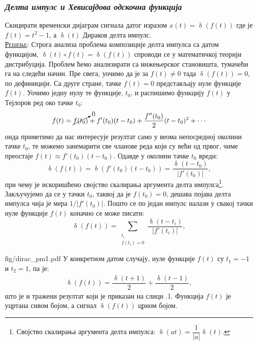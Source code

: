 \subsubsection{\textit{Делта импулс и Хевисајдова одскочна функција}}
\noindent
\PID 
Скицирати временски дијаграм сигнала датог изразом $x(t) = \updelta(f(t))$ где је 
$f(t) = t^2 - 1$, а
$\updelta(t)$ Дираков делта импулс. \\[2mm]

\textsc{\underline{Решење}}: 
Строга анализа проблема композиције делта импулса са датом функцијом, $\updelta(t) \circ f(t) = \updelta(f(t))$ 
спроводи се у математичкој теорији дистрибуција. Проблем ћемо анализирати са инжењерског становишта, 
тумачећи га на следећи начин. Пре свега, уочимо да је за $f(t) \neq 0$ тада $\updelta(f(t)) = 0$, по дефиницији.    
Са друге стране, тачке $f(t) = 0$ представљају нуле функције $f(t)$. Уочимо једну нулу те функције, $t_0$, и распишимо
функцију $f(t)$ у Тејлоров ред око тачке $t_0$:
\begin{eqnarray}
    f(t) = \cancelto{0}{f(t_0)} + f'(t_0) (t-t_0) + \dfrac{f''(t_0)}{2} (t-t_0)^2 + \cdots
\end{eqnarray}
онда приметимо да нас интересује резултат само у веома непосредној околини тачке $t_0$, те можемо занемарити све
чланове реда који су већи од првог, чиме преостаје $f(t) \approx f'(t_0) (t-t_0)$. Одавде у околини тачке 
$t_0$ вреди: 
\begin{equation}
    \updelta(f(t)) = \updelta(f'(t_0) (t-t_0)) = \dfrac{\updelta(t-t_0)}{|f'(t_0)|},
\end{equation}
при чему је искоришћено својство скалирања аргумента делта импулса\footnote{Својство скалирања аргумента делта импулса:
$\updelta(at) = \dfrac{1}{|a|} \updelta(t)$.}.
Закључујемо да се у тачки $t_0$, таквој да је $f(t_0) = 0$, дешава појава делта импулса чија је мера $1/|f'(t_0)|$.
Пошто се по један импулс налази у свакој тачки нуле функције $f(t)$ коначно се може писати:
\begin{equation}
    \updelta(f(t)) = \sum_{\substack{t_i \\[0.5mm] f(t_i)=0}} \dfrac{\updelta(t-t_i)}{|f'(t_i)|},
\end{equation}

\begin{slikaDesno}{fig/dirac_pm1.pdf}
У конкретном датом случају, нуле функције $f(t)$ су ${t_1 = -1}$ и {$t_2 = 1$}, па је:
\begin{eqnarray}
    \updelta(f(t)) = \dfrac{\updelta(t+1)}{2} + \dfrac{\updelta(t-1)}{2},
\end{eqnarray}
што је и тражени резултат који је приказан на слици \ID.1.
Функција $f(t)$ је уцртана сивом бојом, а сигнал $\updelta(f(t))$ црном бојом.

\end{slikaDesno}